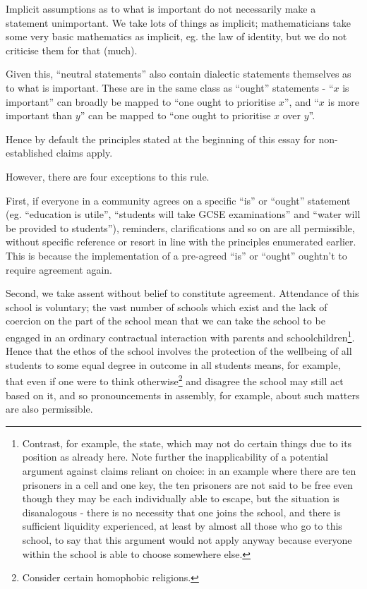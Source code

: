 \documentclass[10pt,a4paper]{article}
\begin{document}
\begin{multicols}{2}
	Implicit assumptions as to what is important do not necessarily make a
	statement unimportant. We take lots of things as implicit;
	mathematicians take some very basic mathematics as implicit, eg. the law
	of identity, but we do not criticise them for that (much).
	
	Given this, ``neutral statements'' also contain dialectic statements
	themselves as to what is important. These are in the same class as
	``ought'' statements - ``$x$ is important'' can broadly be mapped
	to ``one ought to prioritise $x$'', and ``$x$ is more
	important than $y$'' can be mapped to ``one ought to prioritise
	$x$ over $y$''.
	
	Hence by default the principles stated at the beginning of this essay
	for non-established claims apply.
	
	However, there are four exceptions to this rule.
	
	First, if everyone in a community agrees on a specific ``is'' or
	``ought'' statement (eg. ``education is utile'', ``students will take
	GCSE examinations'' and ``water will be provided to students''),
	reminders, clarifications and so on are all permissible, without
	specific reference or resort in line with the principles enumerated
	earlier. This is because the implementation of a pre-agreed ``is'' or
	``ought'' oughtn't to require agreement again.
	
	Second, we take assent without belief to constitute agreement.
	Attendance of this school is voluntary; the vast number of schools which
	exist and the lack of coercion on the part of the school mean that we
	can take the school to be engaged in an ordinary contractual interaction
	with parents and schoolchildren\footnote{Contrast, for example, the
		state, which may not do certain things due to its position as already
		here. Note further the inapplicability of a potential argument against
		claims reliant on choice: in an example where there are ten prisoners
		in a cell and one key, the ten prisoners are not said to be free even
		though they may be each individually able to escape, but the situation
		is disanalogous - there is no necessity that one joins the school, and
		there is sufficient liquidity experienced, at least by almost all
		those who go to this school, to say that this argument would not apply
		anyway because everyone within the school is able to choose somewhere
		else.}. Hence that the ethos of the school involves the protection of
	the wellbeing of all students to some equal degree in outcome in all
	students means, for example, that even if one were to think
	otherwise\footnote{Consider certain homophobic religions.} and disagree
	the school may still act based on it, and so pronouncements in assembly,
	for example, about such matters are also permissible.
	

\end{multicols}
\end{document}
